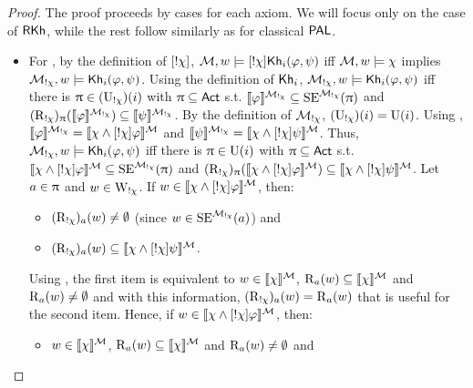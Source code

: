 	\begin{proof} The proof proceeds by cases for each axiom. We will focus only on the case of $\textsf{RKh}$, while the rest follow similarly as for classical $\textsf{PAL}$.
	\begin{itemize}	
	\item For , by the definition of $[!\chi]$, $\mathcal{M},w \models [!\chi]{\sf Kh}_i(\varphi,\psi)$ iff $\mathcal{M},w \models \chi$ implies $\mathcal{M}_{!\chi},w \models {\sf Kh}_i(\varphi,\psi)$. Using the definition of ${\sf Kh}_i$, $\mathcal{M}_{!\chi},w \models {\sf Kh}_i(\varphi,\psi)$ iff there is $\uppi \in (\operatorname{U}_{!\chi})(i)$ with $\uppi \subseteq {\rm \sf Act}$ s.t. $\llbracket \varphi \rrbracket^{\mathcal{M}_{!\chi}} \subseteq \operatorname{SE}^{\mathcal{M}_{!\chi}}(\uppi)$ and $(\operatorname{R}_{!\chi})_\uppi(\llbracket \varphi \rrbracket^{\mathcal{M}_{!\chi}}) \subseteq \llbracket \psi \rrbracket^{\mathcal{M}_{!\chi}}$.
	By the definition of $\mathcal{M}_{!\chi}$, $(\operatorname{U}_{!\chi})(i)=\operatorname{U}(i)$. Using , $\llbracket \varphi \rrbracket^{\mathcal{M}_{!\chi}} = \llbracket \chi \wedge [!\chi]\varphi \rrbracket^{\mathcal{M}}$ and $\llbracket \psi \rrbracket^{\mathcal{M}_{!\chi}} = \llbracket \chi \wedge [!\chi]\psi \rrbracket^{\mathcal{M}}$.
	Thus, $\mathcal{M}_{!\chi},w \models {\sf Kh}_i(\varphi,\psi)$ iff there is $\uppi \in \operatorname{U}(i)$ with $\uppi \subseteq {\rm \sf Act}$ s.t. $\llbracket \chi \wedge [!\chi]\varphi \rrbracket^{\mathcal{M}} \subseteq \operatorname{SE}^{\mathcal{M}_{!\chi}}(\uppi)$ and $(\operatorname{R}_{!\chi})_\uppi(\llbracket \chi \wedge [!\chi]\varphi \rrbracket^{\mathcal{M}}) \subseteq \llbracket \chi \wedge [!\chi]\psi \rrbracket^{\mathcal{M}}$.
	Let $a \in \uppi$ and $w \in \operatorname{W}_{!\chi}$. If $w \in \llbracket \chi \wedge [!\chi]\varphi \rrbracket^{\mathcal{M}}$, then:
	\begin{itemize}
		\item $(\operatorname{R}_{!\chi})_a(w) \neq \emptyset$ (since $w \in \operatorname{SE}^{\mathcal{M}_{!\chi}}(a)$) and
		\item $(\operatorname{R}_{!\chi})_a(w) \subseteq \llbracket \chi \wedge [!\chi]\psi \rrbracket^{\mathcal{M}}$.
	\end{itemize}
	Using , the first item is equivalent to $w \in \llbracket \chi \rrbracket^{\mathcal{M}}$, $\operatorname{R}_a(w) \subseteq \llbracket \chi \rrbracket^{\mathcal{M}}$ and $\operatorname{R}_a(w) \neq \emptyset$ and with this information, $(\operatorname{R}_{!\chi})_a(w) = \operatorname{R}_a(w)$ that is useful for the second item.
	Hence, if $w \in \llbracket \chi \wedge [!\chi]\varphi \rrbracket^{\mathcal{M}}$, then:
	\begin{itemize}
		\item $w \in \llbracket \chi \rrbracket^{\mathcal{M}}$, $\operatorname{R}_a(w) \subseteq \llbracket \chi \rrbracket^{\mathcal{M}}$ and $\operatorname{R}_a(w) \neq \emptyset$ and

\end{itemize}
\end{itemize}
\end{proof}
